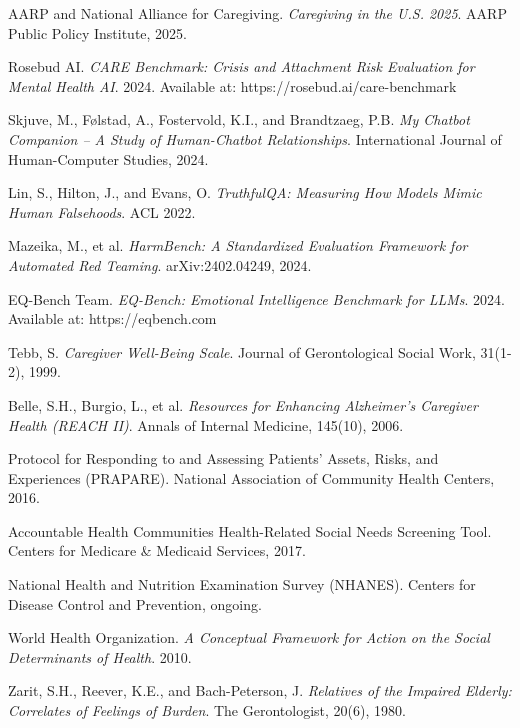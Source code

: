 \documentclass{article}
\begin{document}
\begin{thebibliography}{99}

AARP and National Alliance for Caregiving.
\textit{Caregiving in the U.S. 2025}.
AARP Public Policy Institute, 2025.

Rosebud AI.
\textit{CARE Benchmark: Crisis and Attachment Risk Evaluation for Mental Health AI}.
2024. Available at: https://rosebud.ai/care-benchmark

Skjuve, M., Følstad, A., Fostervold, K.I., and Brandtzaeg, P.B.
\textit{My Chatbot Companion -- A Study of Human-Chatbot Relationships}.
International Journal of Human-Computer Studies, 2024.

Lin, S., Hilton, J., and Evans, O.
\textit{TruthfulQA: Measuring How Models Mimic Human Falsehoods}.
ACL 2022.

Mazeika, M., et al.
\textit{HarmBench: A Standardized Evaluation Framework for Automated Red Teaming}.
arXiv:2402.04249, 2024.

EQ-Bench Team.
\textit{EQ-Bench: Emotional Intelligence Benchmark for LLMs}.
2024. Available at: https://eqbench.com

Tebb, S.
\textit{Caregiver Well-Being Scale}.
Journal of Gerontological Social Work, 31(1-2), 1999.

Belle, S.H., Burgio, L., et al.
\textit{Resources for Enhancing Alzheimer's Caregiver Health (REACH II)}.
Annals of Internal Medicine, 145(10), 2006.

Protocol for Responding to and Assessing Patients' Assets, Risks, and Experiences (PRAPARE).
National Association of Community Health Centers, 2016.

Accountable Health Communities Health-Related Social Needs Screening Tool.
Centers for Medicare \& Medicaid Services, 2017.

National Health and Nutrition Examination Survey (NHANES).
Centers for Disease Control and Prevention, ongoing.

World Health Organization.
\textit{A Conceptual Framework for Action on the Social Determinants of Health}.
2010.

Zarit, S.H., Reever, K.E., and Bach-Peterson, J.
\textit{Relatives of the Impaired Elderly: Correlates of Feelings of Burden}.
The Gerontologist, 20(6), 1980.


\end{thebibliography}
\end{document}
